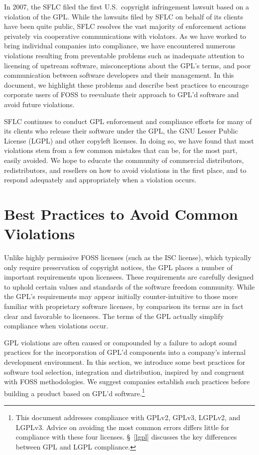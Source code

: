 \documentclass[letterpaper]{fixme}
\begin{document}
In 2007, the SFLC filed the first U.S.~copyright infringement lawsuit
based on a violation of the GPL\@. While the lawsuits filed by SFLC on
behalf of its clients have been quite public, SFLC resolves the vast
majority of enforcement actions privately via
cooperative communications with violators.  As we have worked to bring
individual companies into compliance, we have encountered numerous
violations resulting from preventable problems such as inadequate
attention to licensing of upstream software, misconceptions about the
GPL's terms, and poor communication between software developers and their
management.  In this document, we highlight these problems and describe
best practices to encourage corporate users of FOSS to reevaluate their
approach to GPL'd software and avoid future violations.

SFLC continues to conduct GPL enforcement and compliance efforts for many
of its clients who release their software under the GPL, the GNU Lesser
Public License (LGPL) and other copyleft licenses.  In doing so, we have
found that most violations stem from a few common mistakes that can be,
for the most part, easily avoided.  We hope to educate the community of
commercial distributors, redistributors, and resellers on how to avoid
violations in the first place, and to respond adequately and appropriately
when a violation occurs.

\section{Best Practices to Avoid Common Violations}
\label{best-practices}

Unlike highly permissive FOSS licenses (such as the ISC license), which
typically only require preservation of copyright notices, the GPL places a
number of important requirements upon licensees.  These requirements are
carefully designed to uphold certain values and standards of the software
freedom community.  While the GPL's requirements may appear initially
counter-intuitive to those more familiar with proprietary software
licenses, by comparison its terms are in fact clear and favorable to
licensees.  The terms of the GPL actually simplify compliance when
violations occur.

GPL violations are often caused or compounded by a failure to adopt sound
practices for the incorporation of GPL'd components into a company's
internal development environment.  In this section, we introduce some best
practices for software tool selection, integration and distribution,
inspired by and congruent with FOSS methodologies.  We suggest companies
establish such practices before building a product based on GPL'd
software.\footnote{This document addresses compliance with GPLv2,
  GPLv3, LGPLv2, and LGPLv3.  Advice on avoiding the most common
  errors differs little for compliance with these four licenses.
  \S~\ref{lgpl} discusses the key differences between GPL and LGPL
  compliance.}
\end{document}
